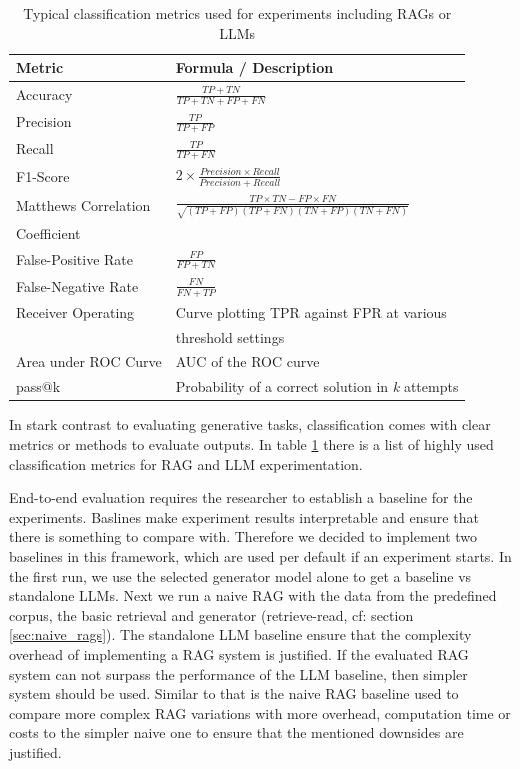 {\renewcommand{\arraystretch}{1.5}%
\begin{table}
  \centering
 \begin{tabular}{|l|l|}
  \hline
  \textbf{Metric} & \textbf{Formula / Description} \\[3pt]
  \hline Accuracy & $\frac{TP + TN}{TP + TN + FP + FN}$\\[5pt]
  \hline Precision & $\frac{TP}{TP + FP}$\\[5pt]
  \hline Recall & $\frac{TP}{TP + FN}$\\[2pt]
  \hline F1-Score & $2 \times \frac{Precision \times Recall}{Precision + Recall}$\\[2pt]
  \hline Matthews Correlation & $\frac{TP \times TN - FP \times FN}{\sqrt{(TP + FP)(TP + FN)(TN + FP)(TN + FN)}}$\\Coefficient & \\[2pt]
  \hline False-Positive Rate & $\frac{FP}{FP + TN}$\\[2pt]
  \hline False-Negative Rate & $\frac{FN}{FN + TP}$\\[2pt]
  \hline Receiver Operating & Curve plotting TPR against FPR at various \\&threshold settings\\[2pt]
  \hline Area under ROC Curve &  AUC of the ROC curve\\[2pt]
  \hline pass@k & Probability of a correct solution in \textit{k} attempts \\[2pt]
  \hline
 \end{tabular}
 \caption{Typical classification metrics used for experiments including RAGs or LLMs\cite{Hou.8212023,Zeng.28.03.2024}}
 \label{table:classification_metrics}
\end{table}}

In stark contrast to evaluating generative tasks, classification comes with clear metrics or methods to evaluate outputs. In table \ref{table:classification_metrics} there is a list of highly used classification metrics for RAG and LLM experimentation.\cite{Hou.8212023,Zeng.28.03.2024} 

End-to-end evaluation requires the researcher to establish a baseline for the experiments. Baslines make experiment results interpretable and ensure that there is something to compare with. Therefore we decided to implement two baselines in this framework, which are used per default if an experiment starts. In the first run, we use the selected generator model alone to get a baseline vs standalone LLMs. Next we run a naive RAG with the data from the predefined corpus, the basic retrieval and generator (retrieve-read, cf: section \ref{sec:naive_rags}). The standalone LLM baseline ensure that the complexity overhead of implementing a RAG system is justified. If the evaluated RAG system can not surpass the performance of the LLM baseline, then simpler system should be used. Similar to that is the naive RAG baseline used to compare more complex RAG variations with more overhead, computation time or costs to the simpler naive one to ensure that the mentioned downsides are justified. 

